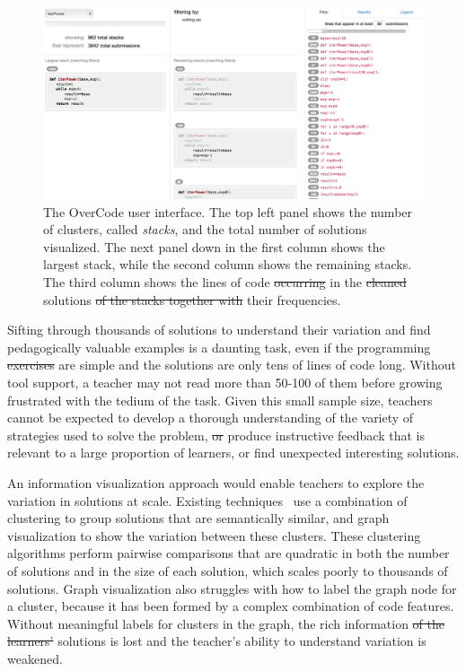 \documentclass[12pt,twoside]{mitthesis}
\providecommand{\DIFaddtex}[1]{{\protect\color{blue}\uwave{#1}}} %
\providecommand{\DIFdeltex}[1]{{\protect\color{red}\sout{#1}}}                      %
\providecommand{\DIFaddbegin}{} %
\providecommand{\DIFaddend}{} %
\providecommand{\DIFdelbegin}{} %
\providecommand{\DIFdelend}{} %
\providecommand{\DIFaddFL}[1]{\DIFadd{#1}} %
\providecommand{\DIFdelFL}[1]{\DIFdel{#1}} %
\providecommand{\DIFaddbeginFL}{} %
\providecommand{\DIFaddendFL}{} %
\providecommand{\DIFdelbeginFL}{} %
\providecommand{\DIFdelendFL}{} %
\providecommand{\DIFadd}[1]{\texorpdfstring{\DIFaddtex{#1}}{#1}} %
\providecommand{\DIFdel}[1]{\texorpdfstring{\DIFdeltex{#1}}{}} %
\begin{document}
{{{{{{{{{{\begin{figure}[t!]
\centering
\includegraphics[width=1.0\linewidth]{Body/figures/overcode/interfaceScreenShot.png}
\caption{The OverCode user interface. The top left panel shows the number of clusters, called {\it stacks}, and the total number of solutions visualized. The next panel down in the first column shows the largest stack, while the second column shows the remaining stacks. The third column shows the lines of code \DIFdelbeginFL \DIFdelFL{occurring }\DIFdelendFL in the \DIFdelbeginFL \DIFdelFL{cleaned }\DIFdelendFL \DIFaddbeginFL \DIFaddFL{platonic }\DIFaddendFL solutions \DIFdelbeginFL \DIFdelFL{of the stacks together with }\DIFdelendFL \DIFaddbeginFL \DIFaddFL{and }\DIFaddendFL their frequencies.}
\label{overcode_fullinterface}
\end{figure}

Sifting through thousands of solutions to understand their variation and find pedagogically valuable examples is a daunting task, even if the programming \DIFdelbegin \DIFdel{exercises }\DIFdelend \DIFaddbegin \DIFadd{problems }\DIFaddend are simple and the solutions are only tens of lines of code long. Without tool support, a teacher may not read more than 50-100 of them before growing frustrated with the tedium of the task. Given this small sample size, teachers cannot be expected to develop a thorough understanding of the variety of strategies used to solve the problem, \DIFdelbegin \DIFdel{or }\DIFdelend produce instructive feedback that is relevant to a large proportion of learners, or find unexpected interesting solutions.

An information visualization approach would enable teachers to explore the variation in solutions at scale. Existing techniques~\cite{gradingsigcse14,MOOCshop,codewebs} use a combination of clustering to group solutions that are semantically similar, and graph visualization to show the variation between these clusters. These clustering algorithms perform pairwise comparisons that are quadratic in both the number of solutions and in the size of each solution, which scales poorly to thousands of solutions. Graph visualization also struggles with how to label the graph node for a cluster, because it has been formed by a complex combination of code features. Without meaningful labels for clusters in the graph, the rich information \DIFdelbegin \DIFdel{of the learners' }\DIFdelend \DIFaddbegin \DIFadd{in student }\DIFaddend solutions is lost and the teacher's ability to understand variation is weakened.

}}}}}}}}}}
\end{document}

